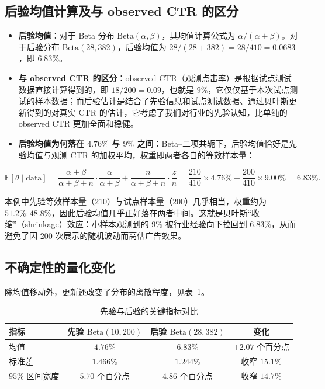 \documentclass[12pt,a4paper,UTF8,fontset=none]{ctexart}
\newcommand{\thead}[1]{\sffamily\bfseries\color{navy}#1}
\newcommand{\tht}{\theta}
\begin{document}
\subsection{后验均值计算及与 observed CTR 的区分}

\begin{itemize}
  \item \textbf{后验均值}：对于 Beta 分布 $\mathrm{Beta}(\alpha,\beta)$，其均值计算公式为 $\alpha/(\alpha+\beta)$。对于后验分布 $\mathrm{Beta}(28,382)$，后验均值为 $28/(28+382)=28/410=0.0683$，即 $6.83\%$。
  \item \textbf{与 observed CTR 的区分}：observed CTR（观测点击率）是根据试点测试数据直接计算得到的，即 $18/200=0.09$，也就是 $9\%$，它仅仅基于本次试点测试的样本数据；而后验估计是结合了先验信息和试点测试数据、通过贝叶斯更新得到的对真实 CTR 的估计，它考虑了我们对行业的先验认知，比单纯的 observed CTR 更加全面和稳健。
  \item \textbf{后验均值为何落在 $4.76\%$ 与 $9\%$ 之间}：Beta–二项共轭下，后验均值恰好是先验均值与观测 CTR 的加权平均，权重即两者各自的等效样本量：
\end{itemize}

\[
  \mathbb{E}[\tht\mid\text{data}]
  =\frac{\alpha+\beta}{\alpha+\beta+n}\cdot\frac{\alpha}{\alpha+\beta}
  +\frac{n}{\alpha+\beta+n}\cdot\frac{z}{n}
  =\frac{210}{410}\times 4.76\% + \frac{200}{410}\times 9.00\%
  = 6.83\%.
\]

本例中先验等效样本量（210）与试点样本量（200）几乎相当，权重约为 $51.2\% : 48.8\%$，因此后验均值几乎正好落在两者中间。这就是贝叶斯“收缩”（shrinkage）效应：小样本观测到的 $9\%$ 被行业经验向下拉回到 $6.83\%$，从而避免了因 200 次展示的随机波动而高估广告效果。

\subsection{不确定性的量化变化}

除均值移动外，更新还改变了分布的离散程度，见表~\ref{tab:uncertainty}。

\begin{table}[H]
\centering
\caption{先验与后验的关键指标对比}
\label{tab:uncertainty}
\begin{tabular}{lccc}
\toprule
\thead{指标} & \thead{先验 $\mathrm{Beta}(10,200)$} & \thead{后验 $\mathrm{Beta}(28,382)$} & \thead{变化} \\
\midrule
均值            & $4.76\%$   & $6.83\%$   & $+2.07$ 个百分点 \\
\rowcolor{softbg} 标准差          & $1.466\%$  & $1.244\%$  & 收窄 $15.1\%$ \\
$95\%$ 区间宽度 & $5.70$ 个百分点 & $4.86$ 个百分点 & 收窄 $14.7\%$ \\
\bottomrule
\end{tabular}
\end{table}
\end{document}
